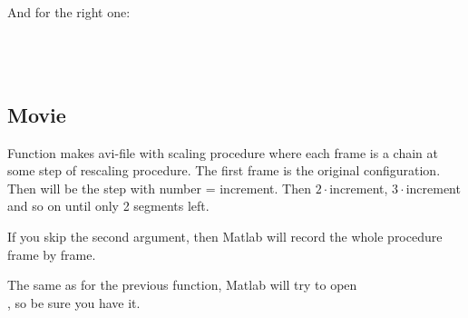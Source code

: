 \documentclass[12pt]{article}
\begin{document}
\begin{mySection}
And for the right one:\\
 \\
 \\
 \\

\subsection{Movie}
Function   makes avi-file with scaling procedure where each frame is a chain at some step of rescaling procedure. The first frame is the original configuration. Then will be the step with number =  increment. Then $2\cdot$increment,  $3\cdot$increment and so on until only 2 segments left.

If you skip the second argument, then Matlab will record the whole procedure frame by frame.

The same as for the previous function, Matlab will try to open \\, so be sure you have it.

\end{mySection}
\end{document}
